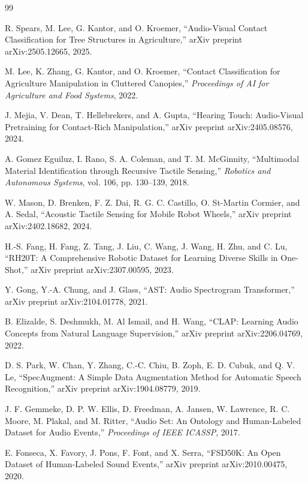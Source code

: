 \documentclass[12pt,a4paper]{article}
\begin{document}
\begin{thebibliography}{99}

R. Spears, M. Lee, G. Kantor, and O. Kroemer,
``Audio-Visual Contact Classification for Tree Structures in Agriculture,''
arXiv preprint arXiv:2505.12665, 2025.

M. Lee, K. Zhang, G. Kantor, and O. Kroemer,
``Contact Classification for Agriculture Manipulation in Cluttered Canopies,''
\textit{Proceedings of AI for Agriculture and Food Systems}, 2022.

J. Mejia, V. Dean, T. Hellebrekers, and A. Gupta,
``Hearing Touch: Audio-Visual Pretraining for Contact-Rich Manipulation,''
arXiv preprint arXiv:2405.08576, 2024.

A. Gomez Eguiluz, I. Rano, S. A. Coleman, and T. M. McGinnity,
``Multimodal Material Identification through Recursive Tactile Sensing,''
\textit{Robotics and Autonomous Systems}, vol. 106, pp. 130--139, 2018.

W. Mason, D. Brenken, F. Z. Dai, R. G. C. Castillo, O. St-Martin Cormier, and A. Sedal,
``Acoustic Tactile Sensing for Mobile Robot Wheels,''
arXiv preprint arXiv:2402.18682, 2024.

H.-S. Fang, H. Fang, Z. Tang, J. Liu, C. Wang, J. Wang, H. Zhu, and C. Lu,
``RH20T: A Comprehensive Robotic Dataset for Learning Diverse Skills in One-Shot,''
arXiv preprint arXiv:2307.00595, 2023.

Y. Gong, Y.-A. Chung, and J. Glass,
``AST: Audio Spectrogram Transformer,''
arXiv preprint arXiv:2104.01778, 2021.

B. Elizalde, S. Deshmukh, M. Al Ismail, and H. Wang,
``CLAP: Learning Audio Concepts from Natural Language Supervision,''
arXiv preprint arXiv:2206.04769, 2022.

D. S. Park, W. Chan, Y. Zhang, C.-C. Chiu, B. Zoph, E. D. Cubuk, and Q. V. Le,
``SpecAugment: A Simple Data Augmentation Method for Automatic Speech Recognition,''
arXiv preprint arXiv:1904.08779, 2019.

J. F. Gemmeke, D. P. W. Ellis, D. Freedman, A. Jansen, W. Lawrence, R. C. Moore, M. Plakal, and M. Ritter,
``Audio Set: An Ontology and Human-Labeled Dataset for Audio Events,''
\textit{Proceedings of IEEE ICASSP}, 2017.

E. Fonseca, X. Favory, J. Pons, F. Font, and X. Serra,
``FSD50K: An Open Dataset of Human-Labeled Sound Events,''
arXiv preprint arXiv:2010.00475, 2020.


\end{thebibliography}
\end{document}
